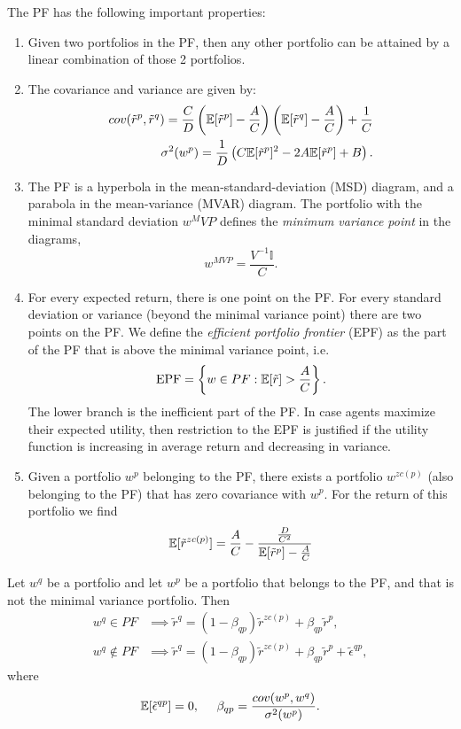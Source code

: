 \documentclass[twoside, titlepage]{article}
\begin{document}
The PF has the following important properties:
\begin{enumerate}
    \item Given two portfolios in the PF, then any other portfolio can be attained by a linear combination of those 2 portfolios.
    \item The covariance and variance are given by:
    \begin{align*}
        cov(\tilde{r}^p, \tilde{r}^q) = \frac{C}{D}\left(\mathbb{E}[\tilde{r}^p] - \frac{A}{C}\right)\left(\mathbb{E}[\tilde{r}^q] - \frac{A}{C}\right) + \frac{1}{C} \\
        \sigma^2(w^p) = \frac{1}{D}\left(C\mathbb{E}[\tilde{r}^p]^2 - 2A\mathbb{E}[\tilde{r}^p] + B\right).
    \end{align*}
    \item The PF is a hyperbola in the mean-standard-deviation (MSD) diagram, and a parabola in the mean-variance (MVAR) diagram. The portfolio with the minimal standard deviation $w^MVP$ defines the \textit{minimum variance point} in the diagrams,
    \[
        w^{MVP} = \frac{V^{-1} \mathbb{I}}{C}.
    \]
    \item For every expected return, there is one point on the PF. For every standard deviation or variance (beyond the minimal variance point) there are two points on the PF. We define the \textit{efficient portfolio frontier} (EPF) as the part of the PF that is above the minimal variance point, i.e.
    \[
        \text{EPF} = \left\{w \in PF : \mathbb{E}[\tilde{r}] > \frac{A}{C}\right\}.
    \]
    The lower branch is the inefficient part of the PF. In case agents maximize their expected utility, then restriction to the EPF is justified if the utility function is increasing in average return and decreasing in variance.

    \item Given a portfolio $w^p$ belonging to the PF, there exists a portfolio $w^{zc(p)}$ (also belonging to the PF) that has zero covariance with $w^p$. For the return of this portfolio we find
    \[
        \mathbb{E}[\tilde{r}^{zc(p)}] = \frac{A}{C} - \frac{\frac{D}{C^2}}{\mathbb{E}[\tilde{r}^p] - \frac{A}{C}}
    \]
\end{enumerate}

\begin{proposition} \label{prop:3.4}
    Let $w^q$ be a portfolio and let $w^p$ be a portfolio that belongs to the PF, and that is not the minimal variance portfolio. Then
    \begin{align*}
        w^q \in PF &\implies \tilde{r}^q = (1-\beta_{qp})\tilde{r}^{zc(p)} + \beta_{qp}\tilde{r}^p, \\
        w^q \not\in PF &\implies \tilde{r}^q = (1-\beta_{qp})\tilde{r}^{zc(p)} + \beta_{qp}\tilde{r}^p + \tilde{\epsilon}^{qp},
    \end{align*}
    where
    \[
        \mathbb{E}[\tilde{\epsilon}^{qp}] = 0, \;\;\;\;\; \beta_{qp} = \frac{cov(w^p, w^q)}{\sigma^2(w^p)}.
    \]
\end{proposition}
\end{document}
